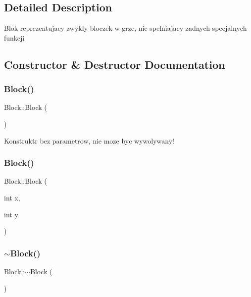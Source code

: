 \subsection{Detailed Description}
Blok reprezentujacy zwykly bloczek w grze, nie spelniajacy zadnych specjalnych funkcji 

\subsection{Constructor \& Destructor Documentation}
\mbox{\label{class_block_a37658a946bf5067ad01d68d9ff086adc}} 
\subsubsection{\texorpdfstring{Block()}{Block()}\hspace{0.1cm}{\footnotesize\ttfamily [1/2]}}
{\footnotesize\ttfamily Block\+::\+Block (\begin{DoxyParamCaption}{ }\end{DoxyParamCaption})}

Konstruktr bez parametrow, nie moze byc wywolywany! \mbox{\label{class_block_a3ff2925a4aa73cb9cabe5097b79f636e}} 
\subsubsection{\texorpdfstring{Block()}{Block()}\hspace{0.1cm}{\footnotesize\ttfamily [2/2]}}
{\footnotesize\ttfamily Block\+::\+Block (\begin{DoxyParamCaption}\item[{int}]{x,  }\item[{int}]{y }\end{DoxyParamCaption})}

\mbox{\label{class_block_a19d1bd0e1cef6a865ed2745a2e648405}} 
\subsubsection{\texorpdfstring{$\sim$\+Block()}{~Block()}}
{\footnotesize\ttfamily Block\+::$\sim$\+Block (\begin{DoxyParamCaption}{ }\end{DoxyParamCaption})}

